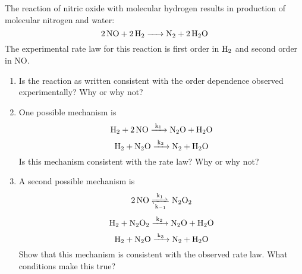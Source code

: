 \item The reaction of nitric oxide with molecular hydrogen results in production of
molecular nitrogen and water:
\begin{equation*}
    \ce{2NO +2H_2 -> N_2 +2H_2O}
\end{equation*}
The experimental rate law for this reaction is first order in $\ce{H_2}$ and second order in
NO.
\begin{enumerate}
    \item Is the reaction as written consistent with the order dependence observed
          experimentally? Why or why not?
    \item One possible mechanism is
          \begin{equation*}
              \ce{H_2 +2NO ->[k_1] N_2O +H_2O}
          \end{equation*}
          \begin{equation*}
              \ce{H_2 +N_2O ->[k_2] N_2 +H_2O}
          \end{equation*}
          Is this mechanism consistent with the rate law? Why or why not?
    \item A second possible mechanism is
          \begin{equation*}
              \ce{2NO <=>[k_1][k_{-1}] N_2O_2}
          \end{equation*}
          \begin{equation*}
              \ce{H_2 + N_2O_2 ->[k_2] N_2O +H_2O}
          \end{equation*}
          \begin{equation*}
              \ce{H_2 +N_2O ->[k_3] N_2 +H_2O}
          \end{equation*}
          Show that this mechanism is consistent with the observed rate law. What
          conditions make this true?
\end{enumerate}


